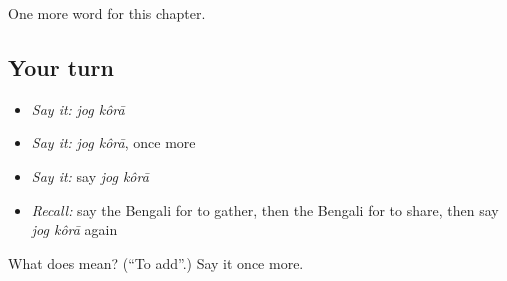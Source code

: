 \begin{grammarlens}[title={What you've built}]
One more word for this chapter.
\end{grammarlens}

\subsection*{Your turn}
\begin{itemize}
\raggedright
  \item \emph{Say it:} \emph{jog kôrā}
  \item \emph{Say it:} \emph{jog kôrā}, once more
  \item \emph{Say it:} say \emph{jog kôrā}
  \item \emph{Recall:} say the Bengali for to gather, then the Bengali for to share, then say \emph{jog kôrā} again
\end{itemize}

\begin{tcolorbox}[breakable,colback=teal!4,colframe=teal!35!black,title={Before you move on}]
What does   mean? (\textquotedblleft{}To add\textquotedblright{}.) Say it once more.
\end{tcolorbox}
